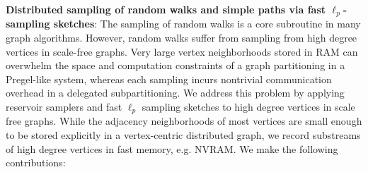 \documentclass[10]{report}
\begin{document}
\noindent
\textbf{Distributed sampling of random walks and simple paths via fast $\ell_p$-sampling sketches}:
The sampling of random walks is a core subroutine in many graph algorithms.
However, random walks suffer from sampling from high degree vertices in scale-free graphs. 
Very large vertex neighborhoods stored in RAM can overwhelm the space and computation constraints of a graph partitioning in a Pregel-like system, whereas each sampling incurs nontrivial communication overhead in a delegated subpartitioning. 
We address this problem by applying reservoir samplers and fast $\ell_p$ sampling sketches to high degree vertices in scale free graphs. 
While the adjacency neighborhoods of most vertices are small enough to be stored explicitly in a vertex-centric distributed graph, we record substreams of high degree vertices in fast memory, e.g. NVRAM. 
We make the following contributions:
%
\end{document}
